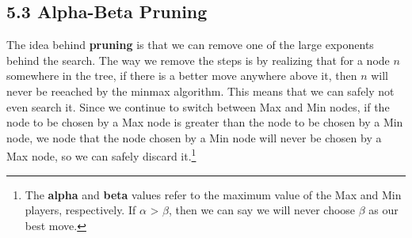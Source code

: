 \documentclass{tufte-handout}
\begin{document}
\subsection{5.3 Alpha-Beta Pruning}
	The idea behind \textbf{pruning} is that we can remove one of the large exponents 
	behind the search. The way we remove the steps is by realizing that for a node 
	$n$ somewhere in the tree, if there is a better move anywhere above it, then $n$
	will never be reeached by the minmax algorithm. This means that we can safely
	not even search it. Since we continue to switch between Max and Min nodes, if the 
	node to be chosen by a Max node is greater than the node to be chosen by a Min node,
	we node that the node chosen by a Min node will never be chosen by a Max node,
	so we can safely discard it.\footnote{The \textbf{alpha} and \textbf{beta} values refer 
	to the maximum value of the Max and Min players, respectively. If $\alpha$ > $\beta$,
	then we can say we will never choose $\beta$ as our best move.} 
\end{document}
